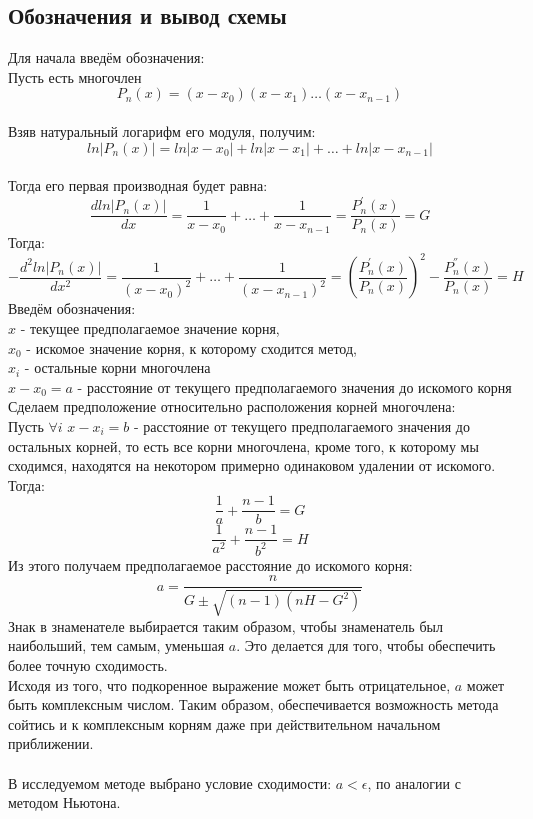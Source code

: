 \documentclass[a4paper,12pt]{article}
\begin{document}
\subsection{Обозначения и вывод схемы}
Для начала введём обозначения: \\
Пусть есть многочлен 
\[P_n(x)=(x-x_0)(x-x_1)\dots(x-x_{n-1})\] \\
Взяв натуральный логарифм его модуля, получим: \\
\[ln|P_n(x)|=ln|x-x_0|+ln|x-x_1|+\dots+ln|x-x_{n-1}|\] \\
Тогда его первая производная будет равна: \\
\begin{equation} \tag{1.1}
    \frac{dln|P_n(x)|}{dx}=\frac{1}{x-x_0}+\dots+\frac{1}{x-x_{n-1}}=\frac{P^{'}_n(x)}{P_n(x)}=G
\end{equation}
Тогда: \\
\begin{equation} \tag{1.2}
    -\frac{d^2ln|P_n(x)|}{dx^2}=\frac{1}{(x-x_0)^2}+\dots+\frac{1}{(x-x_{n-1})^2}=(\frac{P^{'}_n(x)}{P_n(x)})^2-\frac{P^{''}_n(x)}{P_n(x)}=H
\end{equation}
Введём обозначения: \\
$x$ - текущее предполагаемое значение корня, \\
$x_0$ - искомое значение корня, к которому сходится метод, \\
$x_i$ - остальные корни многочлена \\
$x-x_0=a$ - расстояние от текущего предполагаемого значения до искомого корня \\
Сделаем предположение относительно расположения корней многочлена: \\
Пусть $\forall i$ $x-x_i=b$ - расстояние от текущего предполагаемого значения до остальных корней, то есть все корни многочлена, кроме того, к которому мы сходимся, находятся на некотором примерно одинаковом удалении от искомого. Тогда: \\
\begin{equation} \tag{1.3}
    \frac{1}{a}+\frac{n-1}{b}=G
\end{equation}
\begin{equation} \tag{1.4}
    \frac{1}{a^2}+\frac{n-1}{b^2}=H
\end{equation}
Из этого получаем предполагаемое расстояние до искомого корня: \\
\begin{equation} \tag{2}
    a=\frac{n}{G \pm \sqrt{(n-1)(nH-G^2)}}
\end{equation}
Знак в знаменателе выбирается таким образом, чтобы знаменатель был наибольший, тем самым, уменьшая $a$. Это делается для того, чтобы обеспечить более точную сходимость. \\
Исходя из того, что подкоренное выражение может быть отрицательное, $a$ может быть комплексным числом. Таким образом, обеспечивается возможность метода сойтись и к комплексным корням даже при действительном начальном приближении. \\\\
В исследуемом методе выбрано условие сходимости: $a<\epsilon$, по аналогии с методом Ньютона. \\
\newpage
\end{document}
